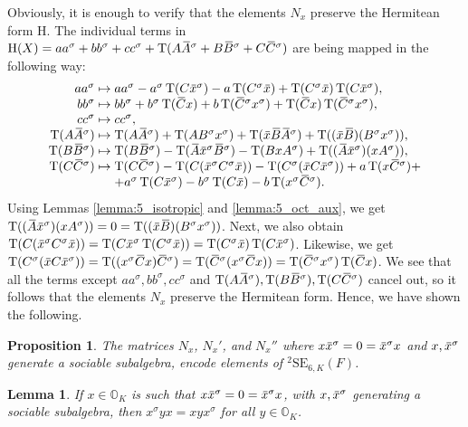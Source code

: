 \documentclass{amsart}
\def\ovA{\mathord{\mbox{\hspace*{0pt}}\,\overline{\!A\!\!\;}\!\:}\mbox{\hspace*{0pt}}}
\def\ovB{\mathord{\mbox{\hspace*{0pt}}\,\overline{\!B\!\!\;}\!\:}\mbox{\hspace*{0pt}}}
\def\ovC{\mathord{\mbox{\hspace*{0pt}}\,\overline{\!C\!\!\;}\!\:}\mbox{\hspace*{0pt}}}
\def\ovx{\mathord{\mbox{\hspace*{0pt}}\,\overline{\!x\!\!\;}\!\:}\mbox{\hspace*{0pt}}}
\def\OO{\mathord{\mathbb{O}}}
\newcommand{\SE}{\mathrm{SE}}
\newcommand{\Tr}{\operatorname{T}}
\renewcommand{\H}{\mathrm{H}}
\newcommand{\s}{\sigma}
\theoremstyle{plain}
\numberwithin{theorem}{section}
\newtheorem{lemma}[theorem]{Lemma}
\newtheorem{proposition}[theorem]{Proposition}
\theoremstyle{definition}
\begin{document}
Obviously, it is enough to verify that the elements $N_x$ preserve the Hermitean form $\H$. 
The individual terms in $\H(X) = aa^{\s} + bb^{\s} + cc^{\s} + \Tr(A\ovA ^{\s} + B\ovB ^{\s} +
C\ovC ^{\s})$ are being mapped in the following way:
\begin{equation}
	\begin{array}{r@{\;}c@{\;}l}
		aa^{\s} & \mapsto & aa^{\s} - a^{\s}\Tr(C\ovx ^{\s}) - a\Tr(C^{\s} \ovx ) 
					+ \Tr(C^{\s}\ovx ) \Tr(C\ovx ^{\s}), \\
		bb^{\s} & \mapsto & bb^{\s} + b^{\s}\Tr(\ovC x) + b\Tr(\ovC ^{\s}x^{\s}) +
					\Tr(\ovC x)\Tr(\ovC ^{\s}x^{\s}), \\
		cc^{\s} & \mapsto & cc^{\s}, \\
		\Tr(A\ovA ^{\s}) & \mapsto & \Tr(A\ovA ^{\s}) + \Tr(AB^{\s}x^{\s}) + 
					\Tr(\ovx \ovB \ovA ^{\s}) + 
					\Tr((\ovx \ovB )(B^{\s}x^{\s})), \\
		\Tr(B\ovB ^{\s}) & \mapsto & \Tr(B\ovB ^{\s}) - 
					\Tr(\ovA \ovx ^{\s} \ovB ^{\s}) - \Tr(BxA^{\s}) + 
					\Tr((\ovA \ovx ^{\s})(xA^{\s})), \\
		\Tr(C\ovC ^{\s}) & \mapsto & \Tr(C\ovC ^{\s}) - 
					\Tr(C(\ovx ^{\s}C^{\s}\ovx )) - \Tr(C^{\s}(\ovx C\ovx ^{\s}))
					+ a\Tr(x\ovC ^{\s}) + \\
					& & + a^{\s}\Tr(C\ovx ^{\s}) -
					b^{\s}\Tr(C\ovx ) - b\Tr(x^{\s}\ovC ^{\s}).
	\end{array}
\end{equation}
Using Lemmas \ref{lemma:5_isotropic} and
\ref{lemma:5_oct_aux}, we get \mbox{$\Tr((\ovA \ovx ^{\s})(xA^{\s})) = 0= \Tr((\ovx \ovB )(B^{\s}x^{\s}))$}.
Next, we also obtain $\Tr(C( \ovx ^{\s} C^{\s} \ovx )) = \Tr(C \ovx ^{\s}
\Tr(C^{\sigma} \ovx )) = \Tr(C^{\sigma} \ovx )\Tr(C\ovx ^{\s})$. Likewise,
we get $\Tr(C^{\s}(\ovx C\ovx ^{\s})) = \Tr ((x^{\s}\ovC x)\ovC ^{\s}) = 
\Tr(\ovC ^{\s} (x^{\s}\ovC x)) = \Tr(\ovC ^{\s} x^{\s})\Tr(\ovC x)$. We see
that all the terms except $aa^{\s},bb^{\s},cc^{\s}$ and $\Tr(A\ovA ^{\s}),
\Tr(B\ovB ^{\s}), \Tr(C\ovC ^{\s})$ cancel out, so it follows that the elements
$N_x$ preserve the Hermitean form. Hence, we have shown the following. 

\begin{proposition}
	\label{prop:5_nx_2se}
	The matrices $N_x$, $N_x'$, and $N_x''$ where $x\ovx^{\s} = 0 = \ovx^{\s}x$ and $x, \ovx^{\s}$
	generate a sociable subalgebra, encode elements of ${}^2\SE_{6,K}(F)$. 
\end{proposition}

\begin{lemma}
	\label{lemma:5_xsyx_eq_xyxs}
	If $x \in \OO_K$ is such that $x \ovx^{\s} = 0 = \ovx^{\s} x$, with $x,\ovx^{\s}$ generating
	a sociable subalgebra, then $x^{\s} y x = x y x^{\s}$ for all $y \in \OO_K$.
\end{lemma}
\end{document}
